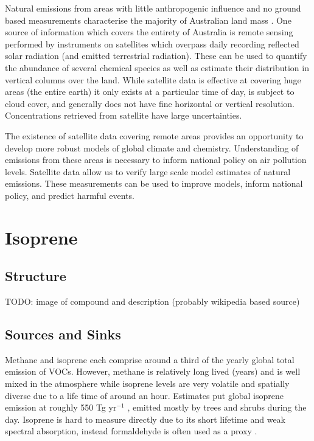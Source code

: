     Natural emissions from areas with little anthropogenic influence and no ground based measurements characterise the majority of Australian land mass \citep{VanDerA2008}.
    One source of information which covers the entirety of Australia is remote sensing performed by instruments on satellites which overpass daily recording reflected solar radiation (and emitted terrestrial radiation).
    These can be used to quantify the abundance of several chemical species as well as estimate their distribution in vertical columns over the land.
    While satellite data is effective at covering huge areas (the entire earth) it only exists at a particular time of day, is subject to cloud cover, and generally does not have fine horizontal or vertical resolution.
    Concentrations retrieved from satellite have large uncertainties.

    The existence of satellite data covering remote areas provides an opportunity to develop more robust models of global climate and chemistry.
    Understanding of emissions from these areas is necessary to inform national policy on air pollution levels.
    Satellite data allow us to verify large scale model estimates of natural emissions.
    These measurements can be used to improve models, inform national policy, and predict harmful events.

\section{Isoprene}
\label{ch1:sec:isoprene}

  \subsection{Structure}
    TODO: image of compound and description (probably wikipedia based source)

  \subsection{Sources and Sinks}
    Methane and isoprene each comprise around a third of the yearly global total emission of VOCs.
    However, methane is relatively long lived (years) and is well mixed in the atmosphere while isoprene levels are very volatile and spatially diverse due to a life time of around an hour.
    Estimates put global isoprene emission at roughly 550 Tg yr$^{-1}$ \citep{Guenther2006,Monks2015}, emitted mostly by trees and shrubs during the day.
    Isoprene is hard to measure directly due to its short lifetime and weak spectral absorption, instead formaldehyde is often used as a proxy \citep{Marais_2012,bauwens2013satellite,Kefauver2014,}.

